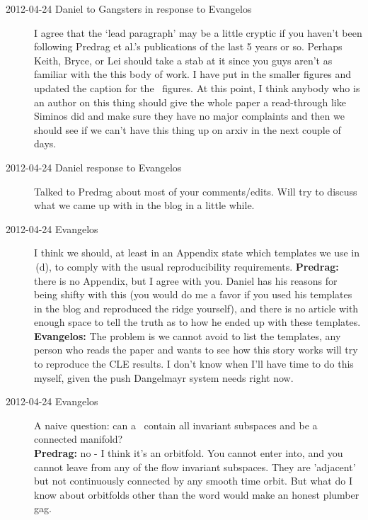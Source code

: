 \begin{description}
\item[2012-04-24 Daniel to Gangsters in response to Evangelos] I
agree that the `lead paragraph' may be a little cryptic if you haven't
been following Predrag et al.'s  publications of the last 5 years or so.
Perhaps Keith, Bryce, or Lei should take a stab at it since you guys
aren't as familiar with the this body of work. I have put in the smaller
figures and updated the caption for the \cLe\ figures. At this point, I
think anybody who is  an author on this thing should give the whole paper
a read-through like Siminos did and make sure they have no major
complaints and then we should see if we can't have this thing up on arxiv
in the next couple of days.

\item[2012-04-24 Daniel response to Evangelos] Talked to Predrag about
most of your comments/edits. Will try to discuss what we came up with in
the blog in a little while.

\item[2012-04-24 Evangelos]
I think we should, at least in an Appendix state which templates we use
in \,(d), to comply with the usual reproducibility
requirements. {\bf Predrag:} there is no Appendix, but I agree with you.
Daniel has his reasons for being shifty with this (you would do me a
favor if you used his templates in the blog and reproduced the ridge
yourself), and there is no article with enough space to tell the truth as
to how he ended up with these templates. {\bf Evangelos:} The problem is
we cannot avoid to list the templates, any person who reads the paper
and wants to see how this story works will try to reproduce the CLE results.
I don't know when I'll have time to do this myself, given the push Dangelmayr
system needs right now.


\item[2012-04-24 Evangelos]
A naive question:
can a \chartBord\ contain all invariant subspaces and be a connected
manifold?
\\
{\bf Predrag:} no - I think it's an orbitfold. You cannot enter into, and
you cannot leave from any of the flow invariant subspaces. They are
'adjacent' but not continuously connected by any smooth time orbit. But
what do I know about orbitfolds other than the word would make an honest
plumber gag.


\end{description}
